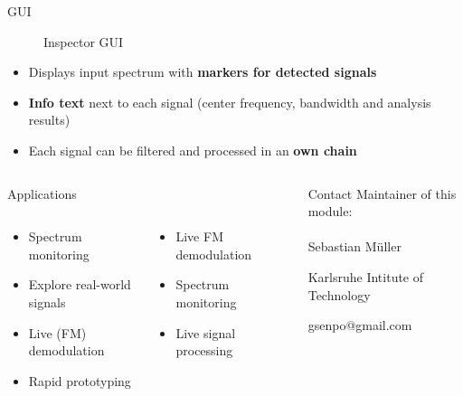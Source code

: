 \documentclass{beamer}
\begin{document}
\begin{frame}
\begin{columns}[t]
\begin{column}{0.66\textwidth}
\begin{block}{GUI}
\begin{figure}
      	\caption{Inspector GUI}
      \end{figure}
      \begin{itemize}
        \item Displays input spectrum with \textbf{markers for detected signals}
        \item \textbf{Info text} next to each signal (center frequency, bandwidth and analysis results)
        \item Each signal can be filtered and processed in an \textbf{own chain}
      \end{itemize}
      \end{block}
    \end{column}
  \end{columns}
  \begin{columns}[t]
  	\begin{column}{0.66\textwidth}
  		\begin{block}{Applications}
  			\begin{columns}
        \begin{column}{0.45\textwidth}
        \begin{itemize}
          \item Spectrum monitoring
          \item Explore real-world signals
          \item Live (FM) demodulation
          \item Rapid prototyping
        \end{itemize}
        \end{column}
        \begin{column}{0.45\textwidth}
         \begin{itemize}
          \item Live FM demodulation
          \item Spectrum monitoring
          \item Live signal processing
        \end{itemize}
        \end{column}
        \end{columns}
  		\end{block}
  	\end{column}
  	\begin{column}{0.01\textwidth}
  	\end{column}
  	\begin{column}{0.33\textwidth}
  		\begin{block}{Contact}
  			Maintainer of this module:\\~\\
  			Sebastian Müller

  			Karlsruhe Intitute of Technology

  			gsenpo@gmail.com
  		\end{block}
  	\end{column}
  \end{columns}
\end{frame}
\end{document}
